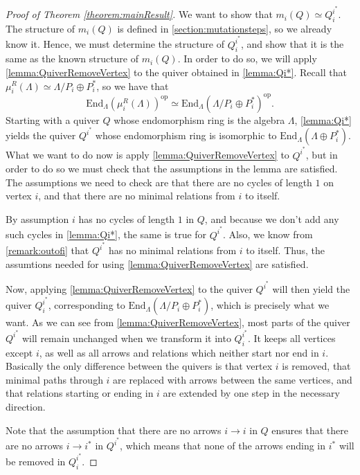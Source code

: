 \documentclass[12pt, dvipsnames, oneside]{amsart}
\theoremstyle{definition}
\newcommand{\End}{\text{End}}
\begin{document}
\begin{proof}[Proof of Theorem \ref{theorem:mainResult}]
We want to show that $m_i(Q)\simeq Q_i^{i^*}$. The structure of $m_i(Q)$ is defined in \cref{section:mutationsteps}, so we already know it. Hence, we must determine the structure of $Q_i^{i^*}$, and show that it is the same as the known structure of $m_i(Q)$.
In order to do so, we will apply \cref{lemma:QuiverRemoveVertex} to the quiver obtained in \cref{lemma:Qi*}. Recall that $\mu_i^R(\Lambda)\simeq\Lambda/P_i\oplus P_i^*$, so we have that 
$$\End_\Lambda(\mu_i^R(\Lambda))^{\text{op}}\simeq\End_\Lambda(\Lambda/P_i\oplus P_i^*)^{\text{op}}.$$
Starting with a quiver $Q$ whose endomorphism ring is the algebra $\Lambda$, \cref{lemma:Qi*} yields the quiver $Q^{i^*}$ whose endomorphism ring is isomorphic to $\End_\Lambda(\Lambda\oplus P_i^*)$. 
What we want to do now is apply \cref{lemma:QuiverRemoveVertex} to $Q^{i^*}$, but in order to do so we must check that the assumptions in the lemma are satisfied. The assumptions we need to check are that there are no cycles of length $1$ on vertex $i$, and that there are no minimal relations from $i$ to itself.

By assumption $i$ has no cycles of length $1$ in $Q$, and because we don't add any such cycles in \cref{lemma:Qi*}, the same is true for $Q^{i^*}$. Also, we know from \cref{remark:outofi} that $Q^{i^*}$ has no minimal relations from $i$ to itself.
Thus, the assumtions needed for using \cref{lemma:QuiverRemoveVertex} are satisfied.

Now, applying \cref{lemma:QuiverRemoveVertex} to the quiver $Q^{i^*}$ will then yield the quiver $Q_i^{i^*}$, corresponding to $\End_\Lambda(\Lambda/P_i\oplus P_i^*)$, which is precisely what we want. 
As we can see from \cref{lemma:QuiverRemoveVertex}, most parts of the quiver $Q^{i^*}$ will remain unchanged when we transform it into $Q_i^{i^*}$. It keeps all vertices except $i$, as well as all arrows and relations which neither start nor end in $i$. Basically the only difference between the quivers is that vertex $i$ is removed, that minimal paths through $i$ are replaced with arrows between the same vertices, and that relations starting or ending in $i$ are extended by one step in the necessary direction. 

Note that the assumption that there are no arrows $i\rightarrow i$ in $Q$ ensures that there are no arrows $i\rightarrow i^*$ in $Q^{i^*}$, which means that none of the arrows ending in $i^*$ will be removed in $Q_i^{i^*}$. 


\end{proof}
\end{document}
